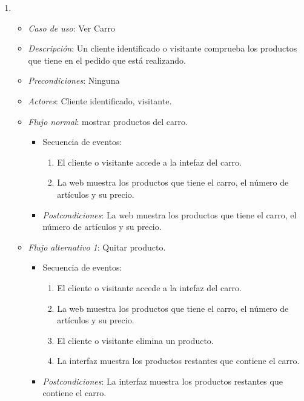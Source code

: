\begin{enumerate}[{\bf UC-1}]
\begin{itemize}

  \end{itemize}

\item 
  \begin{itemize}
  \item {\it Caso de uso}: Ver Carro
  \item {\it Descripción}: Un cliente identificado o visitante comprueba los productos que tiene en el pedido que está realizando.
  \item {\it Precondiciones}: Ninguna


  \item {\it Actores}: Cliente identificado, visitante.
  \item {\it Flujo normal}: mostrar productos del carro.
\begin{itemize}
\item Secuencia de eventos:
    \begin{enumerate}[1. ]
    \item El cliente o visitante accede a la intefaz del carro.
    \item La web muestra los productos que tiene el carro, el número de artículos y su precio.
      


    \end{enumerate}
  \item {\it Postcondiciones}: La web muestra los productos que tiene el carro, el número de artículos y su precio.
\end{itemize}


  \item {\it Flujo alternativo 1}: Quitar producto.
\begin{itemize}
\item Secuencia de eventos:

    \begin{enumerate}[1. ]
	\item El cliente o visitante accede a la intefaz del carro.
    \item La web muestra los productos que tiene el carro, el número de artículos y su precio.
    \item El cliente o visitante elimina un producto.
    \item La interfaz muestra los productos restantes que contiene el carro.
    \end{enumerate}
  \item {\it Postcondiciones}: La interfaz muestra los productos restantes que contiene el carro.
\end{itemize}
    

\end{itemize}
\end{enumerate}
